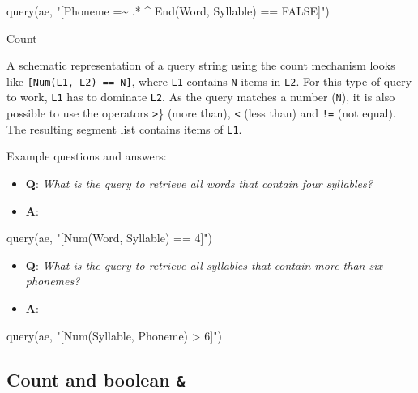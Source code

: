 \documentclass[
]{book}
\newenvironment{Shaded}{\begin{snugshade}}{\end{snugshade}}
\newcommand{\FunctionTok}[1]{\textcolor[rgb]{0.00,0.00,0.00}{#1}}
\newcommand{\NormalTok}[1]{#1}
\newcommand{\StringTok}[1]{\textcolor[rgb]{0.31,0.60,0.02}{#1}}
\providecommand{\tightlist}{%
  \setlength{\itemsep}{0pt}\setlength{\parskip}{0pt}}
\begin{document}
\begin{Shaded}
\begin{Highlighting}[]
\FunctionTok{query}\NormalTok{(ae, }\StringTok{"[Phoneme =\textasciitilde{} .* \^{} End(Word, Syllable) == FALSE]"}\NormalTok{)}
\end{Highlighting}
\end{Shaded}

Count

A schematic representation of a query string using the count mechanism looks like \texttt{{[}Num(L1,\ L2)\ ==\ N{]}}, where \texttt{L1} contains \texttt{N} items in \texttt{L2}. For this type of query to work, \texttt{L1} has to dominate \texttt{L2}. As the query matches a number (\texttt{N}), it is also possible to use the operators \texttt{\textgreater{}}\} (more than), \texttt{\textless{}} (less than) and \texttt{!=} (not equal). The resulting segment list contains items of \texttt{L1}.

Example questions and answers:

\begin{itemize}
\tightlist
\item
  \textbf{Q}: \emph{What is the query to retrieve all words that contain four syllables?}
\item
  \textbf{A}:
\end{itemize}

\begin{Shaded}
\begin{Highlighting}[]
\FunctionTok{query}\NormalTok{(ae, }\StringTok{"[Num(Word, Syllable) == 4]"}\NormalTok{)}
\end{Highlighting}
\end{Shaded}

\begin{itemize}
\tightlist
\item
  \textbf{Q}: \emph{What is the query to retrieve all syllables that contain more than six phonemes?}
\item
  \textbf{A}:
\end{itemize}

\begin{Shaded}
\begin{Highlighting}[]
\FunctionTok{query}\NormalTok{(ae, }\StringTok{"[Num(Syllable, Phoneme) \textgreater{} 6]"}\NormalTok{)}
\end{Highlighting}
\end{Shaded}

\hypertarget{count-and-boolean}{%
\subsection{\texorpdfstring{Count and boolean \texttt{\&}}{Count and boolean \&}}\label{count-and-boolean}}
\end{document}
